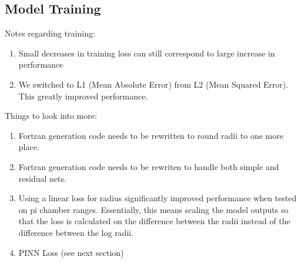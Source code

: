 \documentclass{article}
\begin{document}
\subsection{Model Training}
Notes regarding training:
\begin{enumerate}
	\item Small decreases in training loss can still correspond to large increase in performance
	\item We switched to L1 (Mean Absolute Error) from L2 (Mean Squared Error). This greatly improved performance.
\end{enumerate}
Things to look into more:
\begin{enumerate}
	\item Fortran generation code needs to be rewritten to round radii to one more place.
	\item Fortran generation code needs to be rewriten to handle both simple and residual nets.
	\item Using a linear loss for radius significantly improved performance when tested on pi chamber ranges. Essentially, this means scaling the model outputs so that the loss is calculated on the difference between the radii instead of the difference between the log radii.
	\item PINN Loss (see next section)
\end{enumerate}
\end{document}
